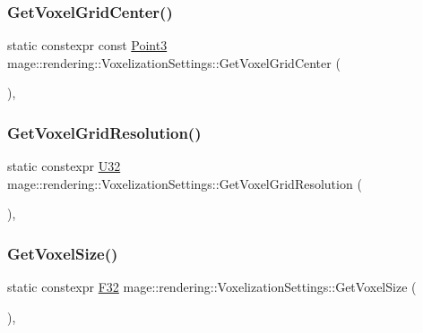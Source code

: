 \subsubsection{\texorpdfstring{Get\+Voxel\+Grid\+Center()}{GetVoxelGridCenter()}}
{\footnotesize\ttfamily static constexpr const \mbox{\hyperlink{structmage_1_1_point3}{Point3}} mage\+::rendering\+::\+Voxelization\+Settings\+::\+Get\+Voxel\+Grid\+Center (\begin{DoxyParamCaption}{ }\end{DoxyParamCaption})\hspace{0.3cm}{\ttfamily [static]}, {\ttfamily [noexcept]}}

\mbox{\label{classmage_1_1rendering_1_1_voxelization_settings_a0a940986058f36311aea31331cb18c14}} 
\subsubsection{\texorpdfstring{Get\+Voxel\+Grid\+Resolution()}{GetVoxelGridResolution()}}
{\footnotesize\ttfamily static constexpr \mbox{\hyperlink{namespacemage_aa5d6eaabaac3cdd01873d6a3d27e90f3}{U32}} mage\+::rendering\+::\+Voxelization\+Settings\+::\+Get\+Voxel\+Grid\+Resolution (\begin{DoxyParamCaption}{ }\end{DoxyParamCaption})\hspace{0.3cm}{\ttfamily [static]}, {\ttfamily [noexcept]}}

\mbox{\label{classmage_1_1rendering_1_1_voxelization_settings_a510d2c8d3d5ebcb88617a0e717f64723}} 
\subsubsection{\texorpdfstring{Get\+Voxel\+Size()}{GetVoxelSize()}}
{\footnotesize\ttfamily static constexpr \mbox{\hyperlink{namespacemage_aa97e833b45f06d60a0a9c4fc22ae02c0}{F32}} mage\+::rendering\+::\+Voxelization\+Settings\+::\+Get\+Voxel\+Size (\begin{DoxyParamCaption}{ }\end{DoxyParamCaption})\hspace{0.3cm}{\ttfamily [static]}, {\ttfamily [noexcept]}}

